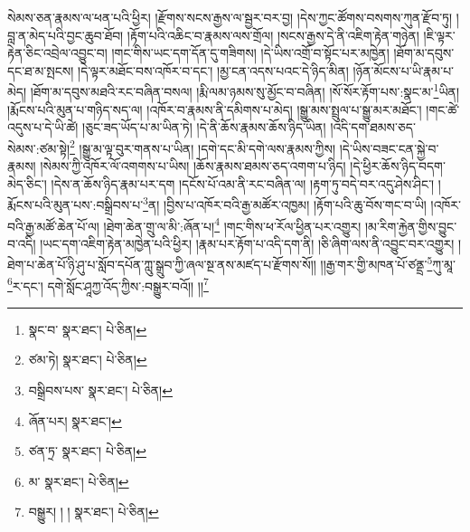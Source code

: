 སེམས་ཅན་རྣམས་ལ་ཕན་པའི་ཕྱིར། །རྫོགས་སངས་རྒྱས་ལ་སྦྱར་བར་བྱ། །དེས་ཀྱང་ཚོགས་བསགས་ཀུན་རྫོབ་ཏུ། །བླ་ན་མེད་པའི་བྱང་ཆུབ་ཐོབ། །རྟོག་པའི་འཆིང་བ་རྣམས་ལས་གྲོལ། །སངས་རྒྱས་དེ་ནི་འཇིག་རྟེན་གཉེན། །ཇི་ལྟར་རྟེན་ཅིང་འབྲེལ་འབྱུང་བ། །གང་གིས་ཡང་དག་དོན་དུ་གཟིགས། །དེ་ཡིས་འགྲོ་བ་སྟོང་པར་མཁྱེན། །ཐོག་མ་དབུས་དང་ཐ་མ་སྤངས། །དེ་ལྟར་མཐོང་བས་འཁོར་བ་དང་། །མྱ་ངན་འདས་པའང་དེ་ཉིད་མིན། །ཉོན་མོངས་པ་ཡི་རྣམ་པ་མེད། །ཐོག་མ་དབུས་མཐའི་རང་བཞིན་བསལ། །རྨི་ལམ་ཉམས་སུ་མྱོང་བ་བཞིན། །སོ་སོར་རྟོག་པས་:སྣང་མ་\footnote{སྣང་བ་  སྣར་ཐང་།  པེ་ཅིན། }ཡིན། །རྨོངས་པའི་མུན་པ་གཉིད་སད་ལ། །འཁོར་བ་རྣམས་ནི་དམིགས་པ་མེད། །སྒྱུ་མས་སྤྲུལ་པ་སྒྱུ་མར་མཐོང་། །གང་ཚེ་འདུས་པ་དེ་ཡི་ཚེ། །ཅུང་ཟད་ཡོད་པ་མ་ཡིན་ཏེ། །དེ་ནི་ཆོས་རྣམས་ཆོས་ཉིད་ཡིན། །འདི་དག་ཐམས་ཅད་སེམས་:ཙམ་སྟེ།\footnote{ཙམ་ཏེ།  སྣར་ཐང་།  པེ་ཅིན། } །སྒྱུ་མ་ལྟ་བུར་གནས་པ་ཡིན། །དགེ་དང་མི་དགེ་ལས་རྣམས་ཀྱིས། །དེ་ཡིས་བཟང་ངན་སྐྱེ་བ་རྣམས། །སེམས་ཀྱི་འཁོར་ལོ་འགགས་པ་ཡིས། །ཆོས་རྣམས་ཐམས་ཅད་འགག་པ་ཉིད། །དེ་ཕྱིར་ཆོས་ཉིད་བདག་མེད་ཅིང་། །དེས་ན་ཆོས་ཉིད་རྣམ་པར་དག །དངོས་པོ་འམ་ནི་རང་བཞིན་ལ། །རྟག་ཏུ་བདེ་བར་འདུ་ཤེས་ཤིང་། །རྨོངས་པའི་མུན་པས་:བསྒྲིབས་པ་\footnote{བསྒྲིབས་པས་  སྣར་ཐང་།  པེ་ཅིན། }ན། །བྱིས་པ་འཁོར་བའི་རྒྱ་མཚོར་འཁྱམ། །རྟོག་པའི་ཆུ་བོས་གང་བ་ཡི། །འཁོར་བའི་རྒྱ་མཚོ་ཆེན་པོ་ལ། །ཐེག་ཆེན་གྲུ་ལ་མི་:ཞོན་པ།\footnote{ཞོན་པར།  སྣར་ཐང་། } །གང་གིས་ཕ་རོལ་ཕྱིན་པར་འགྱུར། །མ་རིག་རྐྱེན་གྱིས་བྱུང་བ་འདི། །ཡང་དག་འཇིག་རྟེན་མཁྱེན་པའི་ཕྱིར། །རྣམ་པར་རྟོག་པ་འདི་དག་ནི། །ཅི་ཞིག་ལས་ནི་འབྱུང་བར་འགྱུར། །ཐེག་པ་ཆེན་པོ་ཉི་ཤུ་པ་སློབ་དཔོན་ཀླུ་སྒྲུབ་ཀྱི་ཞལ་སྔ་ནས་མཛད་པ་རྫོགས་སོ།། །།རྒྱ་གར་གྱི་མཁན་པོ་ཙནྡྲ་\footnote{ཙན་ཏྲ་  སྣར་ཐང་།  པེ་ཅིན། }ཀུ་མཱ་\footnote{མ་  སྣར་ཐང་།  པེ་ཅིན། }ར་དང་། དགེ་སློང་ཤཱཀྱ་འོད་ཀྱིས་:བསྒྱུར་བའོ།། །།\footnote{བསྒྱུར། ། །  སྣར་ཐང་།  པེ་ཅིན། }
